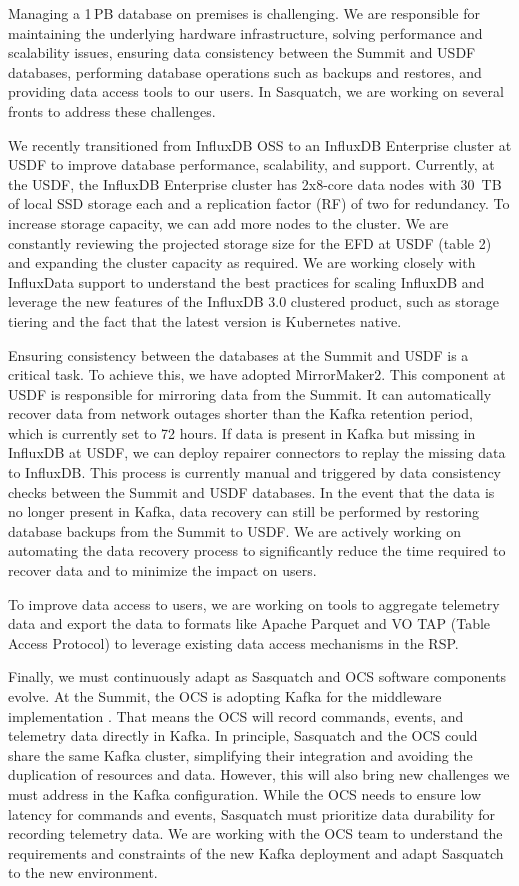 Managing a 1\,PB database on premises is challenging. We are responsible for maintaining the underlying hardware infrastructure, solving performance and scalability issues, ensuring data consistency between the Summit and USDF databases, performing database operations such as backups and restores, and providing data access tools to our users. In Sasquatch, we are working on several fronts to address these challenges.

We recently transitioned from InfluxDB OSS to an InfluxDB Enterprise cluster at USDF to improve database performance, scalability, and support. Currently, at the USDF, the InfluxDB Enterprise cluster has 2x8-core data nodes with 30\ TB of local SSD storage each and a replication factor (RF) of two for redundancy. To increase storage capacity, we can add more nodes to the cluster. We are constantly reviewing the projected storage size for the EFD at USDF (table 2) and expanding the cluster capacity as required. We are working closely with InfluxData support to understand the best practices for scaling InfluxDB and leverage the new features of the InfluxDB 3.0 clustered product, such as storage tiering and the fact that the latest version is Kubernetes native.

Ensuring consistency between the databases at the Summit and USDF is a critical task. To achieve this, we have adopted MirrorMaker2. This component at USDF is responsible for mirroring data from the Summit. It can automatically recover data from network outages shorter than the Kafka retention period, which is currently set to 72 hours. If data is present in Kafka but missing in InfluxDB at USDF, we can deploy repairer connectors to replay the missing data to InfluxDB. This process is currently manual and triggered by data consistency checks between the Summit and USDF databases. In the event that the data is no longer present in Kafka, data recovery can still be performed by restoring database backups from the Summit to USDF. We are actively working on automating the data recovery process to significantly reduce the time required to recover data and to minimize the impact on users.

To improve data access to users, we are working on tools to aggregate telemetry data \cite{SQR-058} and export the data to formats like Apache Parquet and VO TAP (Table Access Protocol)\cite{2019ivoa.spec.0927D} to leverage existing data access mechanisms in the RSP.

Finally, we must continuously adapt as Sasquatch and OCS software components evolve. At the Summit, the OCS is adopting Kafka for the middleware implementation \cite{2024SPIE13101.59Ftmp, TSTN-033}. That means the OCS will record commands, events, and telemetry data directly in Kafka. In principle, Sasquatch and the OCS could share the same Kafka cluster, simplifying their integration and avoiding the duplication of resources and data. However, this will also bring new challenges we must address in the Kafka configuration. While the OCS needs to ensure low latency for commands and events, Sasquatch must prioritize data durability for recording telemetry data. We are working with the OCS team to understand the requirements and constraints of the new Kafka deployment and adapt Sasquatch to the new environment.

